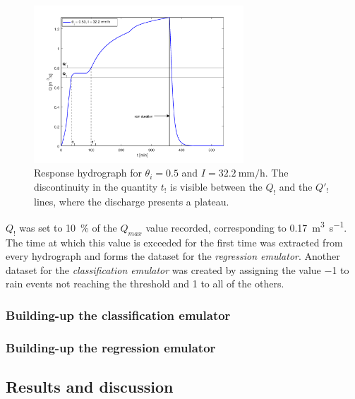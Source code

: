 {\begin{figure}[h]
  \centering
  \includegraphics[width=0.7\textwidth]{Figures/hydrograph.png}
  \caption{Response hydrograph for $\theta_i = \num{0.5}$ and $I = \SI{32.2}{\milli\meter\per\hour}$. The discontinuity in the quantity $t_!$ is visible between the $Q_!$ and the $Q'_!$ lines, where the discharge presents a plateau.}
  \label{fig:hydrograph}
\end{figure}

$Q_!$ was set to \SI{10}{\percent}  of the $Q_{max}$ value recorded, corresponding to \SI{0.17}{\cubic\meter\per\second}.
The time at which this value is exceeded for the first time was extracted from every hydrograph and forms the dataset for the \emph{regression emulator}.
Another dataset for the \emph{classification emulator} was created by assigning the value \num{-1} to rain events not reaching the threshold and \num{1} to all of the others.


\subsubsection{Building-up the classification emulator}


\subsubsection{Building-up the regression emulator}


\subsection{Results and discussion}

}
